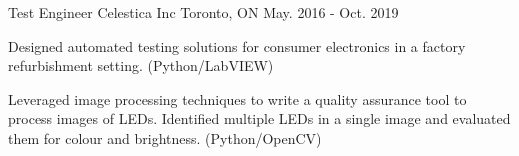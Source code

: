 \begin{cventries}
  \cventry
    {Test Engineer} %
    {Celestica Inc} %
    {Toronto, ON} %
    {May. 2016 - Oct. 2019} %
    {
      \begin{cvitems} %
        \item {Designed automated testing solutions for consumer electronics in a factory refurbishment setting. (Python/LabVIEW)}
        \item {Leveraged image processing techniques to write a quality assurance tool to process images of LEDs. Identified multiple LEDs in a single image and evaluated them for colour and brightness. (Python/OpenCV)}
      \end{cvitems}
    }

\end{cventries}
